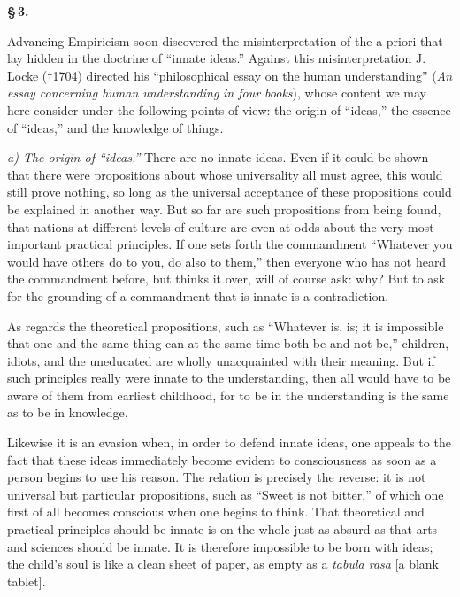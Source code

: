 \documentclass[12pt]{book}
\begin{document}
\begin{center}{\bfseries \S\,3.}\end{center}

Advancing Empiricism soon discovered the misinterpretation of the a priori that
lay hidden in the doctrine of ``innate ideas.'' Against this misinterpretation
J. Locke (†1704) directed his ``philosophical essay on the human understanding''
(\textit{An essay concerning human understanding}
\textit{in four books}), whose content we may here consider under the following
points of view: the origin of ``ideas,'' the essence of ``ideas,'' and the
knowledge of things.

\emph{a) The origin of ``ideas.''} There are no innate ideas. Even if it could be
shown that there were propositions about whose universality all must agree, this
would still prove nothing, so long as the universal acceptance of these
propositions could be explained in another way. But so far are such propositions
from being found, that nations at different levels of culture are even at odds
about the very most important practical principles. If one sets forth the
commandment ``Whatever you would have others do to you, do also to them,'' then
everyone who has not heard the commandment before, but thinks it over, will of
course ask: why? But to ask for the grounding of a commandment that is innate is
a contradiction.

As regards the theoretical propositions, such as ``Whatever is, is; it is
impossible that one and the same thing can at the same time both be and not be,''
children, idiots, and the uneducated are wholly unacquainted with their meaning.
But if such principles really were innate to the understanding, then all would
have to be aware of them from earliest childhood, for to be in the understanding
is the same as to be in knowledge.

Likewise it is an evasion when, in order to defend innate ideas, one appeals to
the fact that these ideas immediately become evident to consciousness as soon as
a person begins to use his reason. The relation is precisely the reverse: it is
not universal but particular propositions, such as ``Sweet is not bitter,'' of
which one first of all becomes conscious when one begins to think. That
theoretical and practical principles should be innate is on the whole just as
absurd as that arts and sciences should be innate. It is therefore impossible to
be born with ideas;
the child's soul is like a clean sheet of paper, as empty as a \textit{tabula
rasa} [a blank tablet].
\end{document}
